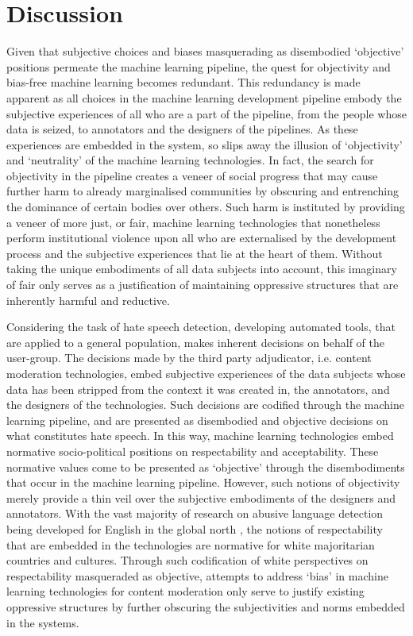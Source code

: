 {\section{Discussion}
Given that subjective choices and biases masquerading as disembodied `objective' positions permeate the machine learning pipeline, the quest for objectivity and bias-free machine learning becomes redundant.
This redundancy is made apparent as all choices in the machine learning development pipeline embody the subjective experiences of all who are a part of the pipeline, from the people whose data is seized, to annotators and the designers of the pipelines.
As these experiences are embedded in the system, so slips away the illusion of `objectivity' and `neutrality' of the machine learning technologies.
In fact, the search for objectivity in the pipeline creates a veneer of social progress that may cause further harm to already marginalised communities by obscuring and entrenching the dominance of certain bodies over others.
Such harm is instituted by providing a veneer of more just, or fair, machine learning technologies that nonetheless perform institutional violence upon all who are externalised by the development process and the subjective experiences that lie at the heart of them.
Without taking the unique embodiments of all data subjects into account, this imaginary of fair only serves as a justification of maintaining oppressive structures that are inherently harmful and reductive.

Considering the task of hate speech detection, developing automated tools, that are applied to a general population, makes inherent decisions on behalf of the user-group.
The decisions made by the third party adjudicator, i.e. content moderation technologies, embed subjective experiences of the data subjects whose data has been stripped from the context it was created in, the annotators, and the designers of the technologies.
Such decisions are codified through the machine learning pipeline, and are presented as disembodied and objective decisions on what constitutes hate speech.
In this way, machine learning technologies embed normative socio-political positions on respectability and acceptability.
These normative values come to be presented as `objective' through the disembodiments that occur in the machine learning pipeline.
However, such notions of objectivity merely provide a thin veil over the subjective embodiments of the designers and annotators.
With the vast majority of research on abusive language detection being developed for English in the global north \citep{Vidgen-Derczynski:2020}, the notions of respectability that are embedded in the technologies are normative for white majoritarian countries and cultures.
Through such codification of white perspectives on respectability masqueraded as objective, attempts to address `bias' in machine learning technologies for content moderation only serve to justify existing oppressive structures by further obscuring the subjectivities and norms embedded in the systems.

}
